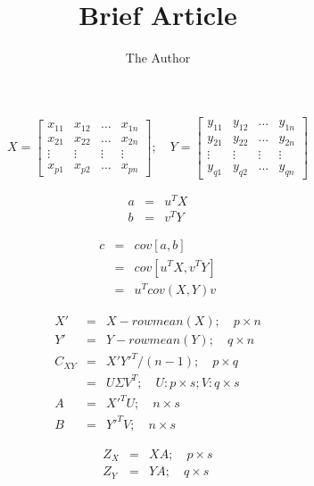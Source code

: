 \documentclass[11pt, oneside]{article}   	%
\title{Brief Article}
\author{The Author}
\begin{document}
\maketitle
\begin{equation}
X = 
\begin{bmatrix}
x_{11} & x_{12} & \ldots & x_{1n} \\
x_{21} & x_{22} & \ldots & x_{2n} \\
\vdots & \vdots & \vdots & \vdots \\
x_{p1} & x_{p2} & \ldots & x_{pn} 
\end{bmatrix}
; \quad
Y = 
\begin{bmatrix}
y_{11} & y_{12} & \ldots & y_{1n} \\
y_{21} & y_{22} & \ldots & y_{2n} \\
\vdots & \vdots & \vdots & \vdots \\
y_{q1} & y_{q2} & \ldots & y_{qn} 
\end{bmatrix}
\end{equation}

\begin{eqnarray}
a & = & u^{T} X \\
b & = & v^{T} Y
\end{eqnarray}

\begin{eqnarray}
c & = & cov[a, b] \\
& = & cov[u^TX, v^TY] \\
& = & u^T cov(X, Y) v
\end{eqnarray}

\begin{eqnarray}
X' & = & X - rowmean(X); \quad p \times n \\
Y' & = & Y - rowmean(Y); \quad q \times n \\
C_{XY} & = & X'Y'^{T} / (n-1); \quad p \times q \\
 & = & U \Sigma V^{T}; \quad U: p \times s; V: q \times s \\
A & = & X'^{T} U; \quad n \times s \\
B & = & Y'^{T} V; \quad n \times s
\end{eqnarray}

\begin{eqnarray}
Z_X & = & X A; \quad p \times s \\
Z_Y & = & Y A; \quad q \times s
\end{eqnarray}
\end{document}
